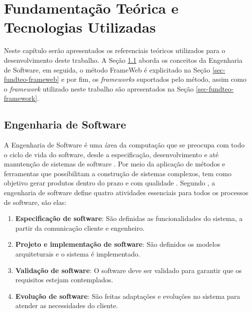 \chapter{Fundamentação Teórica e Tecnologias Utilizadas}
\label{sec-fundteo}

Neste capítulo serão apresentados os referenciais teóricos utilizados para o desenvolvimento
deste trabalho. A Seção \ref{sec-fundteo-engsoft} aborda os conceitos da Engenharia de Software,
em seguida, o método FrameWeb é explicitado na Seção \ref{sec-fundteo-frameweb}
e por fim, os \textit{frameworks} suportados pelo método, assim como o \textit{framework}
utilizado neste trabalho são apresentados na Seção \ref{sec-fundteo-framework}.

\section{Engenharia de Software}
\label{sec-fundteo-engsoft}

A Engenharia de Software é uma área da computação que se preocupa com todo o ciclo de vida do software,
desde a especificação, desenvolvimento e até manutenção de sistemas de software \cite{sommerville:2011}.
Por meio da aplicação de métodos e ferramentas que possibilitam a construção de sistemas complexos,
tem como objetivo gerar produtos dentro do prazo e com qualidade \cite{pressman:2011}.
Segundo , a engenharia de software define quatro atividades
essenciais para todos os processos de software, são elas:


\begin{enumerate}
    \item \textbf{Especificação de software}: São definidas as funcionalidades do 
        sistema, a partir da comunicação cliente e engenheiro.
    \item \textbf{Projeto e implementação de software}: São definidos os modelos 
        arquiteturais e o sistema é implementado.
    \item \textbf{Validação de software}: O software deve ser validado para garantir 
        que os requisitos estejam contemplados.
    \item \textbf{Evolução de software}: São feitas adaptações e evoluções no sistema 
        para atender as necessidades do cliente.
\end{enumerate}

